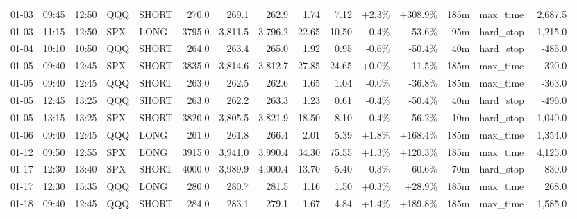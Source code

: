 \documentclass[11pt,a4paper,twoside]{article}
\begin{document}
\begin{landscape}
\begin{center}
\begin{longtable}{>{\color{txtmain}}l l l l l r r r r r r r r >{\color{txtmain}}l r}
01-03 & 09:45 & 12:50 & QQQ & SHORT & 270.0 & 269.1 & 262.9 & 1.74 & 7.12 & \textcolor{wingreen}{+2.3\%} & \textcolor{wingreen}{+308.9\%} & 185m & max\_time & \textcolor{wingreen}{2,687.5} \\
01-03 & 11:15 & 12:50 & SPX & LONG & 3795.0 & 3,811.5 & 3,796.2 & 22.65 & 10.50 & \textcolor{lossred}{-0.4\%} & \textcolor{lossred}{-53.6\%} & 95m & hard\_stop & \textcolor{lossred}{-1,215.0} \\
01-04 & 10:10 & 10:50 & QQQ & SHORT & 264.0 & 263.4 & 265.0 & 1.92 & 0.95 & \textcolor{lossred}{-0.6\%} & \textcolor{lossred}{-50.4\%} & 40m & hard\_stop & \textcolor{lossred}{-485.0} \\
01-05 & 09:40 & 12:45 & SPX & SHORT & 3835.0 & 3,814.6 & 3,812.7 & 27.85 & 24.65 & \textcolor{wingreen}{+0.0\%} & \textcolor{lossred}{-11.5\%} & 185m & max\_time & \textcolor{lossred}{-320.0} \\
01-05 & 09:40 & 12:45 & QQQ & SHORT & 263.0 & 262.5 & 262.6 & 1.65 & 1.04 & \textcolor{lossred}{-0.0\%} & \textcolor{lossred}{-36.8\%} & 185m & max\_time & \textcolor{lossred}{-363.0} \\
01-05 & 12:45 & 13:25 & QQQ & SHORT & 263.0 & 262.2 & 263.3 & 1.23 & 0.61 & \textcolor{lossred}{-0.4\%} & \textcolor{lossred}{-50.4\%} & 40m & hard\_stop & \textcolor{lossred}{-496.0} \\
01-05 & 13:15 & 13:25 & SPX & SHORT & 3820.0 & 3,805.5 & 3,821.9 & 18.50 & 8.10 & \textcolor{lossred}{-0.4\%} & \textcolor{lossred}{-56.2\%} & 10m & hard\_stop & \textcolor{lossred}{-1,040.0} \\
01-06 & 09:40 & 12:45 & QQQ & LONG & 261.0 & 261.8 & 266.4 & 2.01 & 5.39 & \textcolor{wingreen}{+1.8\%} & \textcolor{wingreen}{+168.4\%} & 185m & max\_time & \textcolor{wingreen}{1,354.0} \\
01-12 & 09:50 & 12:55 & SPX & LONG & 3915.0 & 3,941.0 & 3,990.4 & 34.30 & 75.55 & \textcolor{wingreen}{+1.3\%} & \textcolor{wingreen}{+120.3\%} & 185m & max\_time & \textcolor{wingreen}{4,125.0} \\
01-17 & 12:30 & 13:40 & SPX & SHORT & 4000.0 & 3,989.9 & 4,000.4 & 13.70 & 5.40 & \textcolor{lossred}{-0.3\%} & \textcolor{lossred}{-60.6\%} & 70m & hard\_stop & \textcolor{lossred}{-830.0} \\
01-17 & 12:30 & 15:35 & QQQ & LONG & 280.0 & 280.7 & 281.5 & 1.16 & 1.50 & \textcolor{wingreen}{+0.3\%} & \textcolor{wingreen}{+28.9\%} & 185m & max\_time & \textcolor{wingreen}{268.0} \\
01-18 & 09:40 & 12:45 & QQQ & SHORT & 284.0 & 283.1 & 279.1 & 1.67 & 4.84 & \textcolor{wingreen}{+1.4\%} & \textcolor{wingreen}{+189.8\%} & 185m & max\_time & \textcolor{wingreen}{1,585.0} \\

\end{longtable}
\end{center}
\end{landscape}
\end{document}
